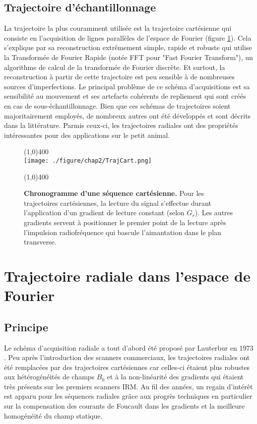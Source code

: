 \subsection{Trajectoire d'échantillonnage}

La trajectoire la plus couramment utilisée est la trajectoire cartésienne qui consiste en l'acquisition de lignes parallèles de l'espace de Fourier (figure \ref{fig:TrajCart}). Cela s'explique par sa reconstruction extrêmement simple, rapide et robuste qui utilise la Transformée de Fourier Rapide (notée FFT pour "Fast Fourier Transform"), un algorithme de calcul de la transformée de Fourier discrète. Et surtout, la reconstruction à partir de cette trajectoire est peu sensible à de nombreuses sources d'imperfections. Le principal problème de ce schéma d'acquisitions est sa sensibilité au mouvement et ses artefacts cohérents de repliement qui sont créés en cas de sous-échantillonnage.
Bien que ces schémas de trajectoires soient majoritairement employés, de nombreux autres ont été développés et sont décrits dans la littérature. Parmis ceux-ci, les trajectoires radiales ont des propriétés intéressantes pour des applications sur le petit animal.

\begin{figure}[h]
\centering
\line(1,0){400} \\
\texttt{[image: ./figure/chap2/TrajCart.png]}
\caption[Chronogramme d'une séquence cartésienne.]{\label{fig:TrajCart} \textbf{Chronogramme d'une séquence cartésienne.} Pour les trajectoires cartésiennes, la lecture du signal s'effectue durant l'application d'un gradient de lecture constant (selon $G_r$). Les autres gradients servent à positionner le premier point de la lecture après l'impulsion radiofréquence qui bascule l'aimantation dans le plan transverse.}
\line(1,0){400} \\
\end{figure}

\section{Trajectoire radiale dans l'espace de Fourier}

\subsection{Principe}
Le schéma d'acquisition radiale a tout d'abord été proposé par Lauterbur en 1973 \cite{lauterbur1973image}. Peu après l'introduction des scanners commerciaux, les trajectoires radiales ont été remplacées par des trajectoires cartésiennes car celles-ci étaient plus robustes aux hétérogénéités de champs $B_0$ et à la non-linéarité des gradients qui étaient très présents sur les premiers scanners IRM. Au fil des années, un regain d'intérêt est apparu pour les séquences radiales grâce aux progrès techniques en particulier sur la compensation des courants de Foucault dans les gradients et la meilleure homogénéité du champ statique. 


